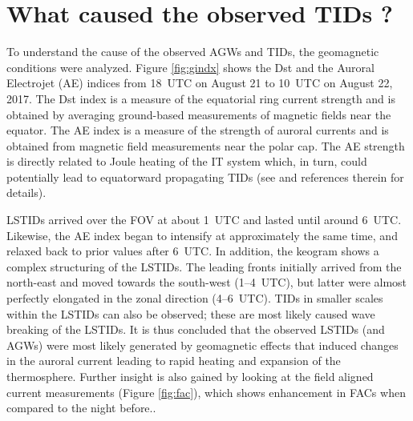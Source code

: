 \documentclass[crop=false,class=mitthesis,oneside,font=12pt]{standalone}
\begin{document}
\section{What caused the observed TIDs ?}
  To understand the cause of the observed AGWs and TIDs, the geomagnetic conditions were analyzed. Figure \ref{fig:gindx} shows the Dst and the Auroral Electrojet (AE) indices from 18~UTC on August 21 to 10~UTC on August 22, 2017. The Dst  index is a measure of the equatorial ring current strength and is obtained by averaging ground-based measurements of magnetic fields near the equator. The AE index is a measure of the strength of auroral currents and is obtained from magnetic field measurements near the polar cap. The AE strength is directly related to Joule heating of the IT system \citep{ae_joule} which, in turn, could potentially lead to equatorward propagating TIDs (see \citep{kauristie_dst} and references therein for details). 
  
LSTIDs arrived over the FOV at about 1~UTC and lasted until around 6~UTC. Likewise, the AE index began to intensify at approximately the same time, and relaxed back to prior values after 6~UTC. In addition, the keogram shows a complex structuring of the LSTIDs. The leading fronts initially arrived from the north-east and moved towards the south-west (1--4~UTC), but latter were almost perfectly elongated in the zonal direction (4--6~UTC). TIDs in smaller scales within the LSTIDs can also be observed; these are most likely caused wave breaking of the LSTIDs. It is thus concluded that the observed LSTIDs (and AGWs) were most likely generated by geomagnetic effects that induced changes in the auroral current leading to rapid heating and expansion of the thermosphere. Further insight is also gained by looking at the field aligned current measurements (Figure \ref{fig:fac}), which shows enhancement in FACs when compared to the night before..
\end{document}
